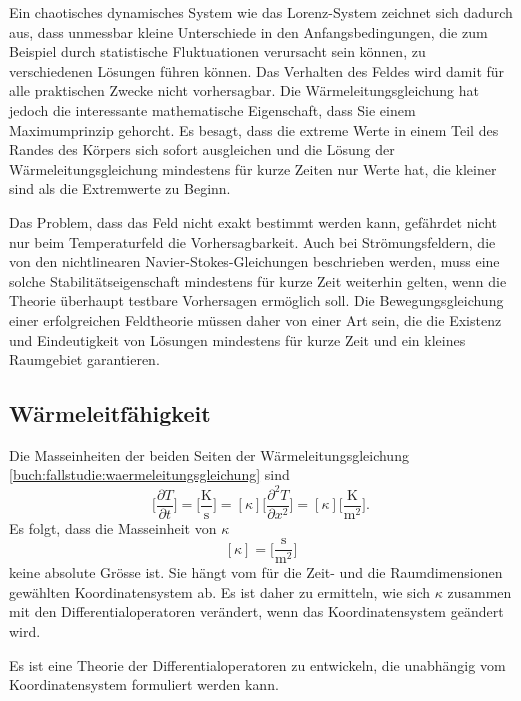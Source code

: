 Ein chaotisches dynamisches System wie das Lorenz-System zeichnet sich
dadurch aus, dass unmessbar kleine Unterschiede in den Anfangsbedingungen,
die zum Beispiel durch statistische Fluktuationen verursacht sein können,
zu verschiedenen Lösungen führen können.
Das Verhalten des Feldes wird damit für alle praktischen Zwecke nicht
vorhersagbar.
Die Wärmeleitungsgleichung hat jedoch die interessante mathematische
Eigenschaft, dass Sie einem Maximumprinzip gehorcht.
Es besagt, dass die extreme Werte in einem Teil des Randes des Körpers
sich sofort ausgleichen und die Lösung der Wärmeleitungsgleichung
mindestens für kurze Zeiten nur Werte hat, die kleiner sind als die 
Extremwerte zu Beginn.

Das Problem, dass das Feld nicht exakt bestimmt werden kann, gefährdet
nicht nur beim Temperaturfeld die Vorhersagbarkeit.
Auch bei Strömungsfeldern, die von den nichtlinearen
Navier-Stokes-Gleichungen beschrieben werden, muss eine solche
Stabilitätseigenschaft mindestens für kurze Zeit weiterhin gelten,
wenn die Theorie überhaupt testbare Vorhersagen ermöglich soll.
Die Bewegungsgleichung einer erfolgreichen Feldtheorie müssen daher
von einer Art sein, die die Existenz und Eindeutigkeit von Lösungen
mindestens für kurze Zeit und ein kleines Raumgebiet garantieren.

\subsection{Wärmeleitfähigkeit}
Die Masseinheiten der beiden Seiten der Wärmeleitungsgleichung 
\eqref{buch:fallstudie:waermeleitungsgleichung}
sind
\[
\biggl[
\frac{\partial T}{\partial t}
\biggr]
=
\biggl[
\frac{\text{K}}{\text{s}}
\biggr]
=
[\kappa]
\biggl[
\frac{\partial^2 T}{\partial x^2}
\biggr]
=
[\kappa]
\biggl[
\frac{\text{K}}{\text{m}^2}
\biggr].
\]
Es folgt, dass die Masseinheit von $\kappa$
\[
[\kappa]
=
\biggl[
\frac{\text{s}}{\text{m}^2}
\biggr]
\]
keine absolute Grösse ist.
Sie hängt vom für die Zeit- und die Raumdimensionen gewählten
Koordinatensystem ab.
Es ist daher zu ermitteln, wie sich $\kappa$ zusammen mit den
Differentialoperatoren verändert, wenn das Koordinatensystem
geändert wird.

\begin{aufgabe}
Es ist eine Theorie der Differentialoperatoren zu entwickeln, die
unabhängig vom Koordinatensystem formuliert werden kann.
\end{aufgabe}

